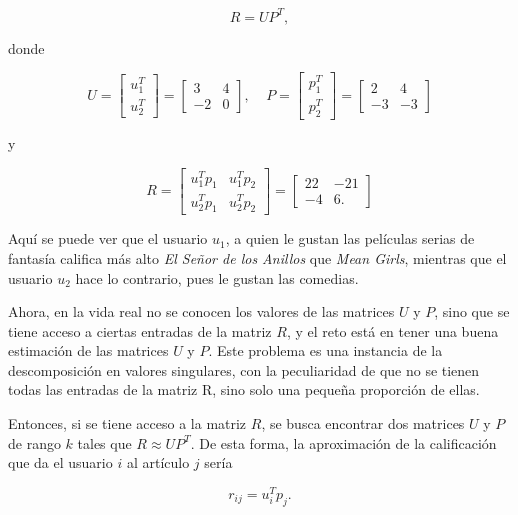 \[
    R = UP^T,
\]


donde

\[
    U = 
    \begin{bmatrix}
         u_1^T \\ 
         u_2^T
    \end{bmatrix} =
    \begin{bmatrix}
         3 & 4 \\ 
         -2 & 0
    \end{bmatrix},\;\;\;\;
    P = 
    \begin{bmatrix}
         p_1^T \\ 
         p_2^T
    \end{bmatrix} =
    \begin{bmatrix}
         2 & 4 \\ 
         -3 & -3
    \end{bmatrix}
\]

y

\[
    R = 
    \begin{bmatrix}
         u_1 ^T p_1 & u_1 ^T p_2 \\ 
         u_2 ^T p_1 & u_2 ^T p_2
    \end{bmatrix}
    =
    \begin{bmatrix}
        22 & -21 \\
        -4 & 6.
    \end{bmatrix}
\]

Aquí se puede ver que el usuario $u_1$, a quien le gustan las películas serias de fantasía califica más alto \textit{El Señor de los Anillos} que \textit{Mean Girls}, mientras que el usuario $u_2$ hace lo contrario, pues le gustan las comedias.

Ahora, en la vida real no se conocen los valores de las matrices $U$ y $P$, sino que se tiene acceso a ciertas entradas de la matriz $R$, y el reto está en tener una buena estimación de las matrices $U$ y $P$. Este problema es una instancia de la descomposición en valores singulares, con la peculiaridad de que no se tienen todas las entradas de la matriz R, sino solo una pequeña proporción de ellas.

Entonces, si se tiene acceso a la matriz $R$, se busca encontrar dos matrices $U$ y $P$ de rango $k$ tales que $R \approx U P^T$. De esta forma, la aproximación de la calificación que da el usuario $i$ al artículo $j$ sería

\begin{equation}\label{ec_fact_basico}
r_{ij} = u_i^T p_j.
\end{equation}


